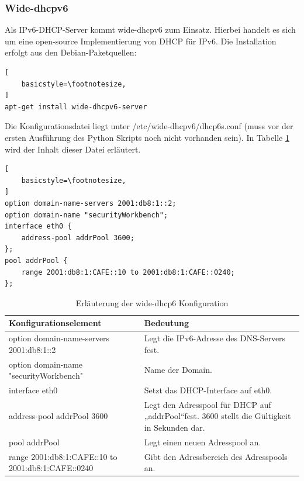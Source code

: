 \subsubsection*{Wide-dhcpv6}
Als IPv6-DHCP-Server kommt wide-dhcpv6 zum Einsatz. Hierbei handelt es sich um eine open-source Implementierung von DHCP für IPv6. Die Installation erfolgt aus den Debian-Paketquellen:
\lstset{language=bash}
\begin{lstlisting}[
	basicstyle=\footnotesize,
]
apt-get install wide-dhcpv6-server
\end{lstlisting}

Die Konfigurationsdatei liegt unter /etc/wide-dhcpv6/dhcp6s.conf (muss vor der ersten Ausführung des Python Skripts noch nicht vorhanden sein). In Tabelle \ref{tab:wideDhcpConfig} wird der Inhalt dieser Datei erläutert.
\begin{lstlisting}[
	basicstyle=\footnotesize,
]
option domain-name-servers 2001:db8:1::2;
option domain-name "securityWorkbench";
interface eth0 {
	address-pool addrPool 3600;
};
pool addrPool {
	range 2001:db8:1:CAFE::10 to 2001:db8:1:CAFE::0240;
};

\end{lstlisting}

\begin{table}
	\centering
		\begin{tabular}{lp{9cm}}
			Konfigurationselement & Bedeutung \\ \hline
			option domain-name-servers 2001:db8:1::2 & Legt die IPv6-Adresse des DNS-Servers fest. \\
			option domain-name "securityWorkbench" & Name der Domain. \\
			interface eth0 & Setzt das DHCP-Interface auf eth0. \\
			address-pool addrPool 3600 & Legt den Adresspool für DHCP auf „addrPool“fest. 3600 stellt die Gültigkeit in Sekunden dar.  \\
			pool addrPool & Legt einen neuen Adresspool an. \\
			range 2001:db8:1:CAFE::10 to 2001:db8:1:CAFE::0240 & Gibt den Adressbereich des Adresspools an. \\
		\end{tabular}
	\caption{Erläuterung der wide-dhcp6 Konfiguration}
	\label{tab:wideDhcpConfig}
\end{table}

\FloatBarrier


